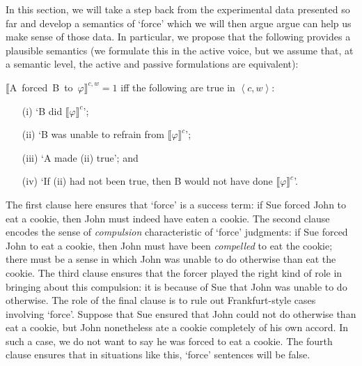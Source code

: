 \documentclass{salt}
\newcommand{\sem}[2]{\mbox{$\llbracket${#2}$\rrbracket^{#1}$}}
\newcommand{\seq}[1]{\left\langle {#1} \right\rangle}
\begin{document}

In this section, we will take a step back from the experimental data presented so far and develop a semantics of `force' which we will then argue argue can help us make sense of those data. In particular, we propose that the following provides a plausible semantics (we formulate this in the active voice, but we assume that, at a semantic level, the active and passive formulations are equivalent):

\begin{exe}\ex \label{102}\sem{c,w}{A forced B to $\varphi$}$=1$ iff the following are true in $\seq{c,w}$: 

\begin{itemize} 
\item[(i)] `B did \sem{c}{$\varphi$}'; \item[(ii)] `B was unable to refrain from \sem{c}{$\varphi$}'; \item[(iii)] `A made (ii) true'; and \item[(iv)] `If (ii) had not been true, then B would not have done \sem{c}{$\varphi$}'.
\end{itemize}
\end{exe}

\noindent The first clause here ensures that `force' is a success term: if Sue forced John to eat a cookie, then John must indeed have eaten a cookie. The second clause encodes the sense of \emph{compulsion} characteristic of `force' judgments: if Sue forced John to eat a cookie, then John must have been \emph{compelled} to eat the cookie; there must be a sense in which John was unable to do otherwise than eat the cookie. The third clause ensures that the forcer played the right kind of role in bringing about this compulsion: it is because of Sue that John was unable to do otherwise. The role of the final clause is to rule out Frankfurt-style cases involving `force'. Suppose that Sue ensured that John could not do otherwise than eat a cookie, but John nonetheless ate a cookie completely of his own accord. In such a case, we do not want to say he was forced to eat a cookie. The fourth clause ensures that in situations like this, `force' sentences will be false.
\end{document}
